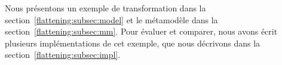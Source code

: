 
Nous présentons un exemple de transformation dans la
section~\ref{flattening:subsec:model} et le métamodèle dans la
section~\ref{flattening:subsec:mm}.  Pour évaluer et comparer, nous avons écrit
plusieurs implémentations de cet exemple, que nous décrivons dans la
section~\ref{flattening:subsec:impl}.

